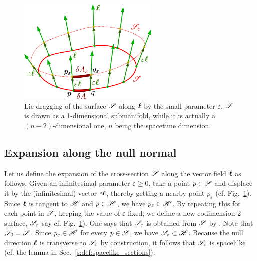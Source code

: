 \begin{figure}
\centerline{\includegraphics[width=0.6\textwidth]{def_expansion.pdf}}
\caption[]{\label{f:def:expansion} \footnotesize
Lie dragging of the surface $\mathscr{S}$ along $\bm{\ell}$ by the small parameter $\varepsilon$.
$\mathscr{S}$ is drawn as a 1-dimensional submanifold, while it is actually a
$(n-2)$-dimensional one, $n$ being the spacetime dimension.}
\end{figure}

\subsection{Expansion along the null normal}

Let us define the expansion of the cross-section $\mathscr{S}$ along the vector
field $\bm{\ell}$ as follows. Given an infinitesimal parameter $\varepsilon\geq 0$, take a point
$p\in \mathscr{S}$ and displace it by the (infinitesimal) vector $\varepsilon \bm{\ell}$, thereby getting
a nearby point $p_\varepsilon$ (cf. Fig.~\ref{f:def:expansion}).
Since $\bm{\ell}$ is tangent to $\mathscr{H}$ and $p\in\mathscr{H}$, we have $p_\varepsilon\in\mathscr{H}$.
By repeating this for each point in $\mathscr{S}$,
keeping the value of $\varepsilon$ fixed, we define a new codimension-2 surface,
$\mathscr{S}_\varepsilon$ say cf. Fig.~\ref{f:def:expansion}). One says that $\mathscr{S}_\varepsilon$ is obtained
from $\mathscr{S}$ by .
Note that $\mathscr{S}_0 = \mathscr{S}$.
Since $p_\varepsilon\in\mathscr{H}$ for every $p\in\mathscr{S}$, we have $\mathscr{S}_\varepsilon\subset \mathscr{H}$.
Because the null direction $\bm{\ell}$ is transverse to $\mathscr{S}_\varepsilon$ by construction, it
follows that $\mathscr{S}_\varepsilon$ is spacelilke (cf. the lemma in Sec.~\ref{s:def:spacelike_sections}).

